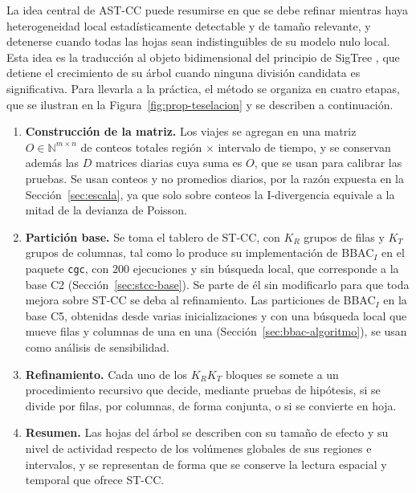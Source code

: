 La idea central de AST-CC puede resumirse en que se debe refinar mientras haya
heterogeneidad local estadísticamente detectable y de tamaño relevante, y
detenerse cuando todas las hojas sean indistinguibles de su modelo nulo local.
Esta idea es la traducción al objeto bidimensional del principio de SigTree
\citep{Hu2025}, que detiene el crecimiento de su árbol cuando ninguna división
candidata es significativa. Para llevarla a la práctica, el método se organiza en
cuatro etapas, que se ilustran en la Figura~\ref{fig:prop-teselacion} y se
describen a continuación.

\begin{enumerate}
  \item \textbf{Construcción de la matriz.} Los viajes se agregan en una
  matriz $O \in \mathbb{N}^{m\times n}$ de conteos totales región $\times$
  intervalo de tiempo, y se conservan además las $D$ matrices diarias cuya
  suma es $O$, que se usan para calibrar las pruebas. Se usan conteos y no
  promedios diarios, por la razón expuesta en la Sección~\ref{sec:escala}, ya que
  solo sobre conteos la I-divergencia equivale a la mitad de la devianza de
  Poisson.
  \item \textbf{Partición base.} Se toma el tablero de ST-CC, con $K_R$ grupos
  de filas y $K_T$ grupos de columnas, tal como lo produce su implementación de
  BBAC$_I$ en el paquete \texttt{cgc}, con 200 ejecuciones y sin búsqueda
  local, que corresponde a la base C2 (Sección~\ref{sec:stcc-base}). Se
  parte de él sin modificarlo para que toda mejora sobre ST-CC se deba al
  refinamiento. Las particiones de BBAC$_I$ en la base C5, obtenidas desde varias
  inicializaciones y con una búsqueda local que mueve filas y columnas de una en
  una (Sección~\ref{sec:bbac-algoritmo}), se usan como análisis de sensibilidad.
  \item \textbf{Refinamiento.} Cada uno de los $K_R K_T$ bloques se somete a
  un procedimiento recursivo que decide, mediante pruebas de hipótesis, si se
  divide por filas, por columnas, de forma conjunta, o si se convierte en hoja.
  \item \textbf{Resumen.} Las hojas del árbol se describen con su tamaño de
  efecto y su nivel de actividad respecto de los volúmenes globales de sus
  regiones e intervalos, y se representan de forma que se conserve la lectura
  espacial y temporal que ofrece ST-CC.
\end{enumerate}


